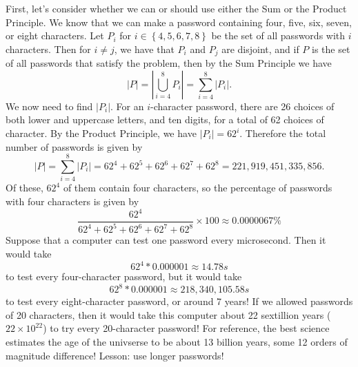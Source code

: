 \documentclass[12pt, letterpaper]{article}
\theoremstyle{definition}
\begin{document}
\vspace*{0.2in}\noindent
First, let's consider whether we can or should use either the Sum or the
Product Principle. We know that we can make a password containing four, five,
six, seven, or eight characters. Let $P_{i}$ for
$i \in \left\{ 4, 5, 6, 7, 8 \right\}$ be the set of all passwords with $i$
characters. Then for $i \neq j$, we have that $P_{i}$ and $P_{j}$ are
disjoint, and if $P$ is the set of all passwords that satisfy the problem, then
by the Sum Principle we have
\begin{equation*}
    |P| = \left|\bigcup_{i=4}^{8}P_{i}\right| = \sum_{i=4}^{8}|P_{i}|.
\end{equation*}
We now need to find $|P_{i}|$. For an $i$-character password, there are
26 choices of both lower and uppercase letters, and ten digits, for a total
of 62 choices of character. By the Product Principle, we have
$|P_{i}| = 62^{i}$. Therefore the total number of passwords is given by
\begin{equation*}
    |P| = \sum_{i=4}^{8}|P_{i}| = 62^4 + 62^5 + 62^6 + 62^7 + 62^8 = 221,919,451,335,856.
\end{equation*}
Of these, $62^4$ of them contain four characters, so the percentage of passwords
with four characters is given by
\begin{equation*}
    \frac{62^4}{62^4 + 62^5 + 62^6 + 62^7 + 62^8} \times 100 \approx 0.0000067 \%
\end{equation*}
Suppose that a computer can test one password every microsecond. Then it would
take
\begin{equation*}
    62^4 * 0.000001 \approx 14.78 s
\end{equation*}
to test every four-character password, but it would take
\begin{equation*}
    62^8 * 0.000001 \approx 218,340,105.58 s
\end{equation*}
to test every eight-character password, or around 7 years!
If we allowed passwords of 20 characters, then it would take this computer about
22 sextillion years ($22 \times 10^{22}$) to try every 20-character password!
For reference, the best science estimates the age of the univserse to be about
13 billion years, some 12 orders of magnitude difference!
Lesson: use longer passwords!
\end{document}
